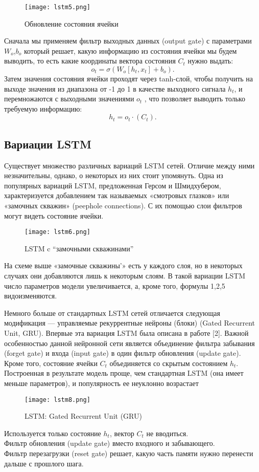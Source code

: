 \documentclass{article}
\begin{document}
      \begin{figure}[H]
	        \centering
	        \texttt{[image: lstm5.png]}
	    \caption{Обновление состояния ячейки}
	    \end{figure}

Сначала мы применяем фильтр выходных данных (output gate) с параметрами
$W_o$,$b_o$ который решает, какую информацию из состояния ячейки мы будем выводить,
то есть какие координаты вектора состояния $C_t$ нужно выдать:
$$o_t=\sigma(W_o[h_t,x_t]+b_o).$$
Затем значения состояния ячейки проходят через tanh-слой, чтобы получить на
выходе значения из диапазона от -1 до 1 в качестве выходного сигнала $h_t$, и перемножаются с выходными значениями $o_t$
, что позволяет выводить только требуемую
информацию:
$$h_t=o_t\cdot(C_t).$$
\subsection{Вариации LSTM}
Существует множество различных вариаций LSTM сетей. Отличие между ними незначительны, однако, о некоторых из них стоит упомянуть.
Одна из популярных вариаций LSTM, предложенная Герсом и Шмидхубером, характеризуется добавлением так называемых «смотровых глазков» или «замочных скважин» (peephole connections). С их помощью слои фильтров могут видеть
состояние ячейки.
      \begin{figure}[H]
	        \centering
	        \texttt{[image: lstm6.png]}
	    \caption{LSTM c “замочными скважинами”}
	        
	    \end{figure}
На схеме выше «замочные скважины’» есть у каждого слоя, но в некоторых случаях они добавляются лишь к некоторым слоям. В такой вариации LSTM число параметров модели увеличивается, а, кроме того, формулы 1,2,5 видоизменяются.

Немного больше от стандартных LSTM сетей отличается следующая модификация
— управляемые рекуррентные нейроны (блоки) (Gated Recurrent Unit, GRU). Впервые эта вариация LSTM была описана в работе [2]. Важной особенностью данной нейронной сети является объединение фильтра забывания (forget gate) и входа (input gate) в
один фильтр обновления (update gate). Кроме того, состояние ячейки $C_t$ объединяется
со скрытым состоянием $h_t$. Построенная в результате модель проще, чем стандартная
LSTM (она имеет меньше параметров), и популярность ее неуклонно возрастает
     
\begin{figure}[H]
	        \centering
	        \texttt{[image: lstm8.png]}
	    \caption{LSTM: Gated Recurrent Unit (GRU)}
	    \end{figure}
     Используется только состояние $h_t$, вектор $C_t$ не вводиться.\\
     Фильтр обновления (update gate) вместо входного и забывающего.\\
     Фильтр перезагрузки (reset gate) решает, какую часть памяти нужно перенести дальше с прошлого шага.
\end{document}

